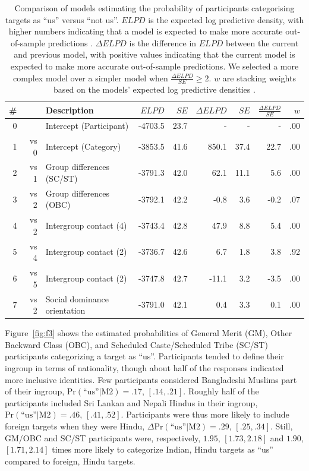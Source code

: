 \documentclass[12pt, a4paper]{article}
\newcommand{\pest}[4]{$ \text{Pr} (\text{``us''} | \text{#1}) = #2$, $[#3, #4]$}
\newcommand{\pdif}[4]{$ \Delta\text{Pr} (\text{``us''} | \text{#1}) = #2$, $[#3, #4]$}
\begin{document}
\begin{table}
\caption{
Comparison of models estimating the probability of participants categorising targets as ``us'' versus ``not us''. $\textit{ELPD}$ is the expected log predictive density, with higher numbers indicating that a model is expected to make more accurate out-of-sample predictions \protect{}. $\Delta\textit{ELPD}$ is the difference in $\textit{ELPD}$ between the current and previous model, with positive values indicating that the current model is expected to make more accurate out-of-sample predictions. We selected a more complex model over a simpler model when $\frac{\Delta\textit{ELPD}}{\textit{SE}} \geq 2$. $w$ are stacking weights based on the models' expected log predictive densities \protect\cite{yao_using_2018}.
}
\centering
{}
\small
\begin{tabularx}{\linewidth}{r@{~}rXrrrrrr} \toprule
\# &  & Description & $\textit{ELPD}$ & $\textit{SE}$ & $\Delta\textit{ELPD}$ & $\textit{SE}$ & $\frac{\Delta\textit{ELPD}}{\textit{SE}}$ & $w$ \\ \midrule 
0 &      & Intercept (Participant) & -4703.5 & 23.7 &     - &    - &    - & .00 \\ 
1 & vs 0 & Intercept (Category)    & -3853.5 & 41.6 & 850.1 & 37.4 & 22.7 & .00 \\
2 & vs 1 & Group differences (SC/ST)       & -3791.3 & 42.0 &  62.1 & 11.1 &  5.6 & .00 \\
3 & vs 2 & Group differences (OBC)         & -3792.1 & 42.2 &  -0.8 &  3.6 & -0.2 & .07 \\ \midrule
4 & vs 2 & Intergroup contact (4) & -3743.4 & 42.8 &  47.9 &  8.8 &  5.4 & .00 \\
5 & vs 4 & Intergroup contact (2) & -3736.7 & 42.6 &   6.7 &  1.8 &  3.8 & .92 \\
6 & vs 5 & Intergroup contact (2) & -3747.8 & 42.7 & -11.1 &  3.2 & -3.5 & .00 \\
7 & vs 2 & Social dominance orientation & -3791.0 & 42.1 &   0.4 &  3.3 &  0.1 & .00 \\
\bottomrule
\end{tabularx}
\label{tab:t2}
\end{table}

Figure~\ref{fig:f3} shows the estimated probabilities of General Merit (GM), Other Backward Class (OBC), and Scheduled Caste/Scheduled Tribe (SC/ST) participants categorizing a target as ``us''. Participants tended to define their ingroup in terms of nationality, though about half of the responses indicated more inclusive identities. Few participants considered Bangladeshi Muslims part of their ingroup, \pest{M2}{.17}{.14}{.21}. Roughly half of the participants included Sri Lankan and Nepali Hindus in their ingroup, \pest{M2}{.46}{.41}{.52}. Participants were thus more likely to include foreign targets when they were Hindu, \pdif{M2}{.29}{.25}{.34}. Still, GM/OBC and SC/ST participants were, respectively, $1.95$, $[1.73, 2.18]$ and $1.90$, $[1.71, 2.14]$ times more likely to categorize Indian, Hindu targets as ``us'' compared to foreign, Hindu targets.
\end{document}
